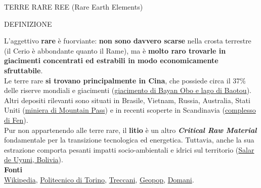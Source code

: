 \documentclass[aspectratio=1610]{beamer}
\begin{document}
\begin{frame}{TERRE RARE REE (Rare Earth Elements)}
    \begin{alertblock}{DEFINIZIONE}
        \begin{minipage}{0.98\linewidth}
            \justifying
            L'aggettivo \textbf{rare} è fuorviante: \textbf{non sono davvero scarse} nella crosta terrestre 
            (il Cerio è abbondante quanto il Rame), ma è \textbf{molto raro trovarle in giacimenti concentrati 
            ed estrabili in modo economicamente sfruttabile}.\\
            Le terre rare \textbf{si trovano principalmente in Cina}, che possiede circa il 37\% delle 
            riserve mondiali e giacimenti (\href{https://www.corriere.it/scienze/cards/baotou-dove-terre-rare-sonola-ricchezza-l-inferno/lago-tossico.shtml}{giacimento di Bayan Obo e lago di Baotou}). Altri depositi rilevanti sono 
            situati in Brasile, Vietnam, Russia, Australia, Stati Uniti (\href{https://maps.app.goo.gl/18n891GdjekG3gUYA}{miniera di Mountain Pass}) 
            e in recenti scoperte in Scandinavia (\href{https://maps.app.goo.gl/KcZ3zzt2gH5o9AsB8}{complesso di Fen}).\\
            Pur non appartenendo alle terre rare, il \textbf{litio} è un altro \textit{\textbf{Critical Raw Material}} 
            fondamentale per la transizione tecnologica ed energetica. Tuttavia, anche la sua estrazione comporta 
            pesanti impatti socio-ambientali e idrici sul territorio (\href{https://maps.app.goo.gl/pj4bNWESTddzBQnR7}{Salar de Uyuni, Bolivia}).\\
            \bigskip
            \tiny{\textbf{Fonti}}\\
            \tiny{\href{https://it.wikipedia.org/wiki/Terre_rare}{Wikipedia}}, 
            \tiny{\href{https://www.polito.it/ateneo/comunicazione-e-ufficio-stampa/poliflash/le-terre-rare-sono-solo-la-punta-dell-iceberg}{Politecnico di Torino}}, 
            \tiny{\href{https://www.treccani.it/enciclopedia/terre-rare/}{Treccani}}, 
            \tiny{\href{https://www.geopop.it/terre-rare-cosa-sono-dove-si-estraggono-e-il-monopolio-cinese/}{Geopop}}, 
            \tiny{\href{https://www.editorialedomani.it/tecnologia/intelligenza-artificiale-quanto-inquina-miniere-litio-discariche-kinx6xvj}{Domani}}.
        \end{minipage}
    \end{alertblock}
\end{frame}
\end{document}
